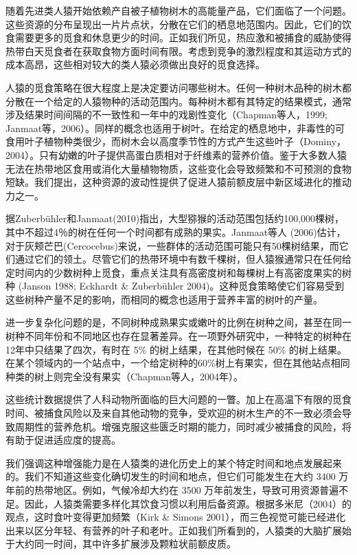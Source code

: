 随着先进类人猿开始依赖产自被子植物树木的高能量产品，它们面临了一个问题。这些资源的分布呈现出一片片点状，分散在它们的栖息地范围内。因此，它们的饮食需要更多的觅食和休息更少的时间。正如我们所见，热应激和被捕食的威胁使得热带白天觅食者在获取食物方面时间有限。考虑到竞争的激烈程度和其运动方式的成本高昂，这些相对较大的类人猿必须做出良好的觅食选择。

人猿的觅食策略在很大程度上是决定要访问哪些树木。任何一种树木品种的树木都分散在一个给定的人猿物种的活动范围内。每种树木都有其特定的结果模式，通常涉及结果时间间隔的不一致性和一年中的戏剧性变化（Chapman等人，1999; Janmaat等，2006）。同样的概念也适用于树叶。在给定的栖息地中，非毒性的可食用叶子植物种类很少，而树木会以高度季节性的方式产生这些叶子（Dominy，2004）。只有幼嫩的叶子提供高蛋白质相对于纤维素的营养价值。鉴于大多数人猿无法在热带地区食用或消化大量植物物质，这些变化会导致频繁和不可预测的食物短缺。我们提出，这种资源的波动性提供了促进人猿前额皮层中新区域进化的推动力之一。

据Zuberbühler和Janmaat(2010)指出，大型猕猴的活动范围包括约100,000棵树，其中不超过4％的树在任何一个时间都有成熟的果实。Janmaat等人 (2006)估计，对于灰颊芒巴(Cercocebus)来说，一些群体的活动范围可能只有50棵树结果，而它们通过它们的领土。尽管它们的热带环境中有数千棵树，但人猿猴通常只在任何给定时间内的少数树种上觅食，重点关注具有高密度树和每棵树上有高密度果实的树种 (Janson 1988; Eckhardt \& Zuberbühler 2004)。这种觅食策略使它们容易受到这些树种产量不足的影响，而相同的概念也适用于营养丰富的树叶的产量。

进一步复杂化问题的是，不同树种成熟果实或嫩叶的比例在树种之间，甚至在同一树种不同年份和不同地区也存在显著差异。在一项野外研究中，一种特定的树种在12年中只结果了四次，有时在 5\% 的树上结果，在其他时候在 50\% 的树上结果。在某个领域内的一个站点中，一个给定树种的60\%树上有果实，但在其他站点相同种类的树上则完全没有果实（Chapman等人，2004年）。

这些统计数据提供了人科动物所面临的巨大问题的一瞥。加上在高温下有限的觅食时间、被捕食风险以及来自其他动物的竞争，受欢迎的树木生产的不一致必须会导致周期性的营养危机。增强克服这些匮乏时期的能力，同时减少被捕食的风险，将有助于促进适应度的提高。

我们强调这种增强能力是在人猿类的进化历史上的某个特定时间和地点发展起来的。我们不知道这些变化确切发生的时间和地点，但它们可能发生在大约 3400 万年前的热带地区。例如，气候冷却大约在 3500 万年前发生，导致可用资源普遍不足。因此，人猿类需要多样化其饮食习惯以利用后备资源。根据多米尼（2004）的观点，这时食叶变得更加频繁（Kirk \& Simons 2001），而三色视觉可能已经进化出来以区分年轻、有营养的叶子和老叶。正如我们所看到的，人猿类的大脑扩展始于大约同一时间，其中许多扩展涉及颗粒状前额皮质。

